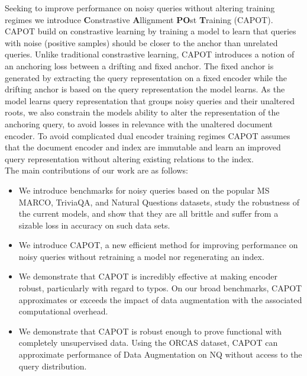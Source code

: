 Seeking to improve performance on noisy queries without altering training regimes we introduce \textbf{C}onstrastive \textbf{A}llignment \textbf{PO}st \textbf{T}raining (CAPOT). CAPOT build on constrastive learning by training a model to learn that queries with noise (positive samples) should be closer to the anchor than unrelated queries. Unlike traditional constrastive learning, CAPOT introduces a notion of an anchoring loss between a drifting and fixed anchor. The fixed anchor is generated by extracting the query representation on a fixed encoder while the drifting anchor is based on the query representation the model learns. As the model learns query representation that groups noisy queries and their unaltered roots, we also constrain the models ability to alter the representation of the anchoring query, to avoid losses in relevance with the unaltered document encoder. To avoid complicated dual encoder training regimes CAPOT assumes that the document encoder and index are immutable and learn an improved query representation without altering existing relations to the index. \\
The main contributions of our work are as follows:
\begin{itemize}
\item We introduce benchmarks for noisy queries based on the popular MS MARCO, TriviaQA, and Natural Questions datasets, study the robustness of the current models, and show that they are all brittle and suffer from  
a sizable loss in accuracy on such data sets. 
\item We introduce CAPOT, a new efficient method for improving performance on noisy queries without retraining a model nor regenerating an index. 
\item We demonstrate that CAPOT is incredibly effective at making encoder robust, particularly with regard to typos. On our broad benchmarks, CAPOT approximates or exceeds the impact of data augmentation with the associated computational overhead.
\item We demonstrate that CAPOT is robust enough to prove functional with completely unsupervised data. Using the ORCAS dataset, CAPOT can approximate performance of Data Augmentation on NQ without access to the query distribution.
\end{itemize}
